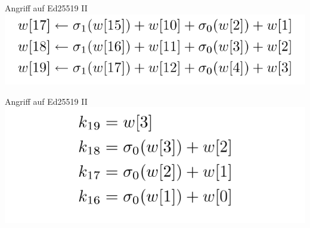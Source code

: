 \documentclass[
  11 pt,
  ignorenonframetext,
  aspectratio=43,
]{beamer}
\begin{document}
\begin{frame}{Angriff auf Ed25519 II}
\protect\hypertarget{angriff-auf-ed25519-ii-1}{}
\includegraphics{Abbildungen/msw.png}
\end{frame}

\begin{frame}{Angriff auf Ed25519 II}
\protect\hypertarget{angriff-auf-ed25519-ii-2}{}
\includegraphics{Abbildungen/msw_recover.png}
\end{frame}
\end{document}
